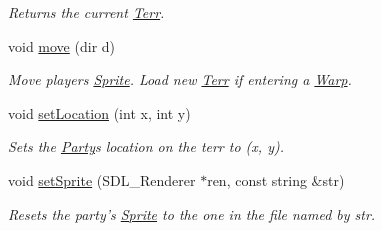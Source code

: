 \begin{DoxyCompactItemize}
\begin{DoxyCompactList}\small\item\em Returns the current \hyperlink{class_terr}{Terr}. \end{DoxyCompactList}\item 
void \hyperlink{class_party_a6260aeac8da674bc894709ad392c1360}{move} (dir d)\hypertarget{class_party_a6260aeac8da674bc894709ad392c1360}{}\label{class_party_a6260aeac8da674bc894709ad392c1360}

\begin{DoxyCompactList}\small\item\em Move player\textquotesingle{}s \hyperlink{class_sprite}{Sprite}. Load new \hyperlink{class_terr}{Terr} if entering a \hyperlink{class_warp}{Warp}. \end{DoxyCompactList}\item 
void \hyperlink{class_party_a2efe239264b319d3b50e1a5957fcd859}{set\+Location} (int x, int y)\hypertarget{class_party_a2efe239264b319d3b50e1a5957fcd859}{}\label{class_party_a2efe239264b319d3b50e1a5957fcd859}

\begin{DoxyCompactList}\small\item\em Sets the \hyperlink{class_party}{Party}\textquotesingle{}s location on the terr to (x, y). \end{DoxyCompactList}\item 
void \hyperlink{class_party_abe069ffbbf3352f6b39246c8382dd26b}{set\+Sprite} (S\+D\+L\+\_\+\+Renderer $\ast$ren, const string \&str)\hypertarget{class_party_abe069ffbbf3352f6b39246c8382dd26b}{}\label{class_party_abe069ffbbf3352f6b39246c8382dd26b}

\begin{DoxyCompactList}\small\item\em Resets the party’s \hyperlink{class_sprite}{Sprite} to the one in the file named by str. \end{DoxyCompactList}\end{DoxyCompactItemize}
